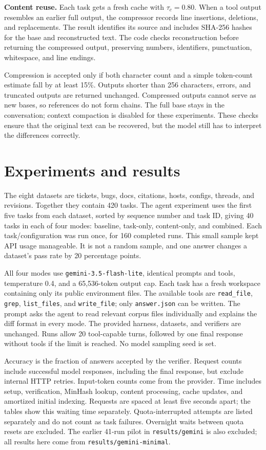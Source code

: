 \documentclass[10pt]{article}
\begin{document}
\textbf{Content reuse.} Each task gets a fresh cache with $\tau_c=0.80$.
When a tool output resembles an earlier full output, the compressor records
line insertions, deletions, and replacements. The result identifies its source
and includes SHA-256 hashes for the base and reconstructed text. The code
checks reconstruction before returning the compressed output, preserving
numbers, identifiers, punctuation, whitespace, and line endings.

Compression is accepted only if both character count and a simple token-count
estimate fall by at least 15\%. Outputs shorter than 256 characters, errors,
and truncated outputs are returned unchanged. Compressed outputs cannot serve
as new bases, so references do not form chains. The full base stays in the
conversation; context compaction is disabled for these experiments. These
checks ensure that the original text can be recovered, but the model still
has to interpret the differences correctly.

\section{Experiments and results}
The eight datasets are tickets, bugs, docs, citations, hosts, configs, threads,
and revisions. Together they contain 420 tasks. The agent experiment uses the
first five tasks from each dataset, sorted by sequence number and task ID,
giving 40 tasks in each of four modes: baseline, task-only, content-only, and
combined. Each task/configuration was run once, for 160 completed runs.
This small sample kept API usage manageable. It is not a random sample, and
one answer changes a dataset's pass rate by 20 percentage points.

All four modes use \texttt{gemini-3.5-flash-lite}, identical prompts and tools,
temperature 0.4, and a 65,536-token output cap. Each task has a fresh workspace
containing only its public environment files. The available tools are
\texttt{read\_file}, \texttt{grep}, \texttt{list\_files}, and
\texttt{write\_file}; only \texttt{answer.json} can be written. The prompt asks
the agent to read relevant corpus files individually and explains the diff
format in every mode. The provided harness, datasets, and verifiers are
unchanged. Runs allow 20 tool-capable turns, followed by one final response
without tools if the limit is reached. No model sampling seed is set.

Accuracy is the fraction of answers accepted by the verifier. Request counts
include successful model responses, including the final response, but exclude
internal HTTP retries. Input-token counts come from the provider. Time includes
setup, verification, MinHash lookup, content processing, cache updates, and
amortized initial indexing. Requests are spaced at least five seconds apart;
the tables show this waiting time separately. Quota-interrupted attempts are
listed separately and do not count as task failures. Overnight waits between
quota resets are excluded. The earlier 41-run pilot in \texttt{results/gemini}
is also excluded; all results here come from \texttt{results/gemini-minimal}.
\end{document}
